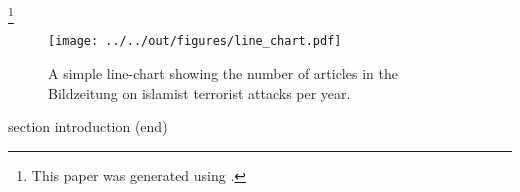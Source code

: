 \documentclass[11pt, a4paper, leqno]{article}
\begin{document}
 \footnote{This paper was generated using \citet{GaudeckerEconProjectTemplates}.}
%

\begin{figure}
   \caption{A simple line-chart showing the number of articles in the Bildzeitung on islamist terrorist attacks per year.}
  
 \texttt{[image: ../../out/figures/line\_chart.pdf]}

\end{figure}


 section introduction (end)




{}





\end{document}

